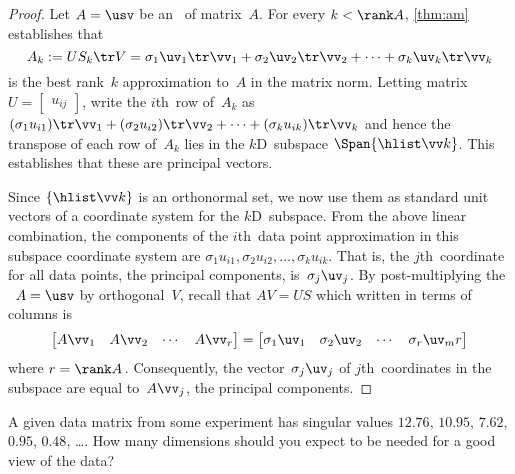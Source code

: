 \begin{proof} 
Let \(A=\usv\) be an \svd\ of matrix~\(A\).
For every \(k<\rank A\), \autoref{thm:am} establishes that 
\begin{equation*}
A_k:=US_k\tr V 
=\sigma_1\uv_1\tr\vv_1 +\sigma_2\uv_2\tr\vv_2+\cdots +\sigma_k\uv_k\tr\vv_k
\end{equation*}
is the best rank~\(k\) approximation to~\(A\) in the matrix norm.
Letting matrix \(U=\begin{bmatrix} u_{ij} \end{bmatrix}\), write the \(i\)th~row of~\(A_k\) as
\((\sigma_1u_{i1})\tr\vv_1 +(\sigma_2u_{i2})\tr\vv_2+\cdots +(\sigma_ku_{ik})\tr\vv_k\) and hence the transpose of each row of~\(A_k\) lies in the \(k\)D~subspace \(\Span\{\hlist\vv k\}\).
This establishes that these are principal vectors.

Since \(\{\hlist\vv k\}\) is an orthonormal set, we now use them as standard unit vectors of a coordinate system for the \(k\)D~subspace.
From the above linear combination, the components of the \(i\)th~data point approximation in this subspace coordinate system are \(\sigma_1u_{i1},\sigma_2u_{i2},\ldots,\sigma_ku_{ik}\).
That is, the \(j\)th~coordinate for all data points, the principal components, is~\(\sigma_j\uv_j\).
By post-multiplying the \svd\ \(A=\usv\) by orthogonal~\(V\), recall that \(AV=US\) which written in terms of columns is
\begin{equation*}
\begin{bmatrix} A\vv_1&A\vv_2&\cdots&A\vv_r \end{bmatrix}
=\begin{bmatrix} \sigma_1\uv_1&\sigma_2\uv_2&\cdots&\sigma_r\uv_mr\end{bmatrix}
\end{equation*}
where \(r=\rank A\)\,.  
Consequently, the vector~\(\sigma_j\uv_j\) of \(j\)th~coordinates in the subspace are equal to~\(A\vv_j\), the principal components.
\end{proof}




\begin{activity}
A given data matrix from some experiment has singular values \(12.76\), \(10.95\), \(7.62\), \(0.95\), \(0.48\), \ldots.  
How many dimensions should you expect to be needed for a good view of the data?
\end{activity}






